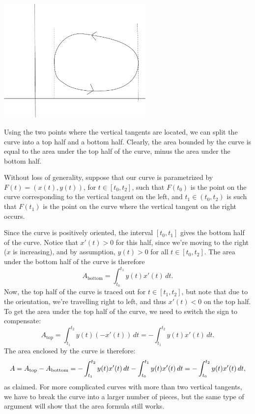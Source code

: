 \documentclass[letterpaper,12pt]{article}
\begin{document}
\begin{center}
 \includegraphics[width=3in]{Curve2.pdf}
\end{center}
Using the two points where the vertical tangents are located, we can split the curve into a top half and a bottom half. Clearly, the area bounded by the curve is equal to the area under the top half of the curve, minus the area under the bottom half.

Without loss of generality, suppose that our curve is parametrized by $F(t)=(x(t),y(t))$, for $t\in [t_0,t_2]$, such that $F(t_0)$ is the point on the curve corresponding to the vertical tangent on the left, and $t_1\in(t_0,t_2)$ is such that $F(t_1)$ is the point on the curve where the vertical tangent on the right occurs.

Since the curve is positively oriented, the interval $[t_0,t_1]$ gives the bottom half of the curve. Notice that $x'(t)>0$ for this half, since we're moving to the right ($x$ is increasing), and by assumption, $y(t)>0$ for all $t\in [t_0,t_2]$. The area under the bottom half of the curve is therefore
\[
A_{\text{bottom}} = \int_{t_0}^{t_1}y(t)x'(t)\,dt.
\]
Now, the top half of the curve is traced out for $t\in [t_1,t_2]$, but note that due to the orientation, we're travelling right to left, and thus $x'(t)<0$ on the top half. To get the area under the top half of the curve, we need to switch the sign to compensate:
\[
A_{\text{top}} = \int_{t_1}^{t_2}y(t)(-x'(t))\,dt = -\int_{t_1}^{t_2}y(t)x'(t)\,dt.
\]
The area enclosed by the curve is therefore:
\[
A  = A_{\text{top}}-A_{\text{bottom}}\\
=-\int_{t_1}^{t_2}y(t)x'(t)\,dt - \int_{t_0}^{t_1}y(t)x'(t)\,dt = -\int_{t_0}^{t_2}y(t)x'(t)\,dt,
\]
as claimed. For more complicated curves with more than two vertical tangents, we have to break the curve into a larger number of pieces, but the same type of argument will show that the area formula still works.
\end{document}
